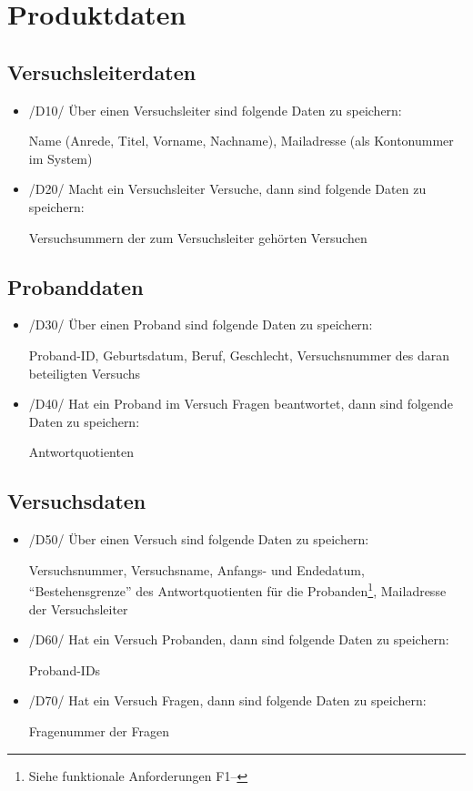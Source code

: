 \documentclass[a4paper]{scrreprt}
\begin{document}
    \chapter{Produktdaten}
        \section{Versuchsleiterdaten}
            \begin{itemize}
                \item /D10/ Über einen Versuchsleiter sind folgende Daten zu speichern:
                    \par Name (Anrede, Titel, Vorname, Nachname), Mailadresse (als Kontonummer im System)

                \item /D20/ Macht ein Versuchsleiter Versuche, dann sind folgende Daten zu speichern:
                    \par Versuchsummern der zum Versuchsleiter gehörten Versuchen
            \end{itemize}

        \section{Probanddaten}
            \begin{itemize}
                \item /D30/ Über einen Proband sind folgende Daten zu speichern:
                    \par Proband-ID, Geburtsdatum, Beruf, Geschlecht, Versuchsnummer des daran beteiligten Versuchs

                \item /D40/ Hat ein Proband im Versuch Fragen beantwortet, dann sind folgende Daten zu speichern:
                    \par Antwortquotienten
            \end{itemize}

        \section{Versuchsdaten}
            \begin{itemize}
                \item /D50/ Über einen Versuch sind folgende Daten zu speichern:
                    \par Versuchsnummer, Versuchsname, Anfangs- und Endedatum, “Bestehensgrenze” des Antwortquotienten für die Probanden\footnote{Siehe funktionale Anforderungen F1--}, Mailadresse der Versuchsleiter

                \item /D60/ Hat ein Versuch Probanden, dann sind folgende Daten zu speichern:
                    \par Proband-IDs

                \item /D70/ Hat ein Versuch Fragen, dann sind folgende Daten zu speichern:
                    \par Fragenummer der Fragen
            \end{itemize}
\end{document}
